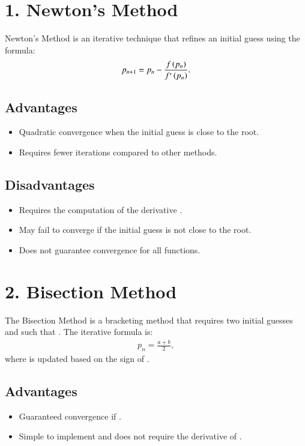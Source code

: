 \documentclass[journal]{IEEEtran}
\begin{document}
\section*{1. Newton's Method}
Newton's Method is an iterative technique that refines an initial guess  using the formula:
\begin{align}
    p_{n+1} = p_n - \frac{f\left(p_n\right)}{f'\left(p_n\right)}.
\end{align}

\subsection*{Advantages}
\begin{itemize}
    \item Quadratic convergence when the initial guess is close to the root.
    \item Requires fewer iterations compared to other methods.
\end{itemize}

\subsection*{Disadvantages}
\begin{itemize}
    \item Requires the computation of the derivative .
    \item May fail to converge if the initial guess is not close to the root.
    \item Does not guarantee convergence for all functions.
\end{itemize}

\section*{2. Bisection Method}
The Bisection Method is a bracketing method that requires two initial guesses  and  such that . The iterative formula is:
\begin{align}
    p_{n} = \frac{a + b}{2},
\end{align}
where  is updated based on the sign of .

\subsection*{Advantages}
\begin{itemize}
    \item Guaranteed convergence if .
    \item Simple to implement and does not require the derivative of .
\end{itemize}
\end{document}
